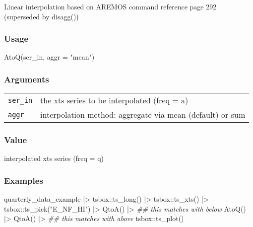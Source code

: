 \documentclass[
  letterpaper,
  DIV=11,
  numbers=noendperiod]{scrreport}
\newenvironment{Shaded}{\begin{snugshade}}{\end{snugshade}}
\newcommand{\AttributeTok}[1]{\textcolor[rgb]{0.40,0.45,0.13}{#1}}
\newcommand{\DocumentationTok}[1]{\textcolor[rgb]{0.37,0.37,0.37}{\textit{#1}}}
\newcommand{\FunctionTok}[1]{\textcolor[rgb]{0.28,0.35,0.67}{#1}}
\newcommand{\NormalTok}[1]{\textcolor[rgb]{0.00,0.23,0.31}{#1}}
\newcommand{\SpecialCharTok}[1]{\textcolor[rgb]{0.37,0.37,0.37}{#1}}
\newcommand{\StringTok}[1]{\textcolor[rgb]{0.13,0.47,0.30}{#1}}
\begin{document}
Linear interpolation based on AREMOS command reference page 292
(superseded by disagg())

\subsubsection{Usage}\label{usage-28}

\begin{Shaded}
\begin{Highlighting}[]
\FunctionTok{AtoQ}\NormalTok{(ser\_in, }\AttributeTok{aggr =} \StringTok{"mean"}\NormalTok{)}
\end{Highlighting}
\end{Shaded}

\subsubsection{Arguments}\label{arguments-28}

\begin{longtable}[]{@{}ll@{}}
\toprule\noalign{}
\endhead
\bottomrule\noalign{}
\endlastfoot
\texttt{ser\_in} & the xts series to be interpolated (freq = a) \\
\texttt{aggr} & interpolation method: aggregate via mean (default) or
sum \\
\end{longtable}

\subsubsection{Value}\label{value-28}

interpolated xts series (freq = q)

\subsubsection{Examples}\label{examples-28}

\begin{Shaded}
\begin{Highlighting}[]
\NormalTok{quarterly\_data\_example }\SpecialCharTok{|\textgreater{}}
\NormalTok{  tsbox}\SpecialCharTok{::}\FunctionTok{ts\_long}\NormalTok{() }\SpecialCharTok{|\textgreater{}}
\NormalTok{  tsbox}\SpecialCharTok{::}\FunctionTok{ts\_xts}\NormalTok{() }\SpecialCharTok{|\textgreater{}}
\NormalTok{  tsbox}\SpecialCharTok{::}\FunctionTok{ts\_pick}\NormalTok{(}\StringTok{"E\_NF\_HI"}\NormalTok{) }\SpecialCharTok{|\textgreater{}}
  \FunctionTok{QtoA}\NormalTok{() }\SpecialCharTok{|\textgreater{}} \DocumentationTok{\#\# this matches with below}
  \FunctionTok{AtoQ}\NormalTok{() }\SpecialCharTok{|\textgreater{}}
  \FunctionTok{QtoA}\NormalTok{() }\SpecialCharTok{|\textgreater{}} \DocumentationTok{\#\# this matches with above}
\NormalTok{  tsbox}\SpecialCharTok{::}\FunctionTok{ts\_plot}\NormalTok{()}
\end{Highlighting}
\end{Shaded}
\end{document}
